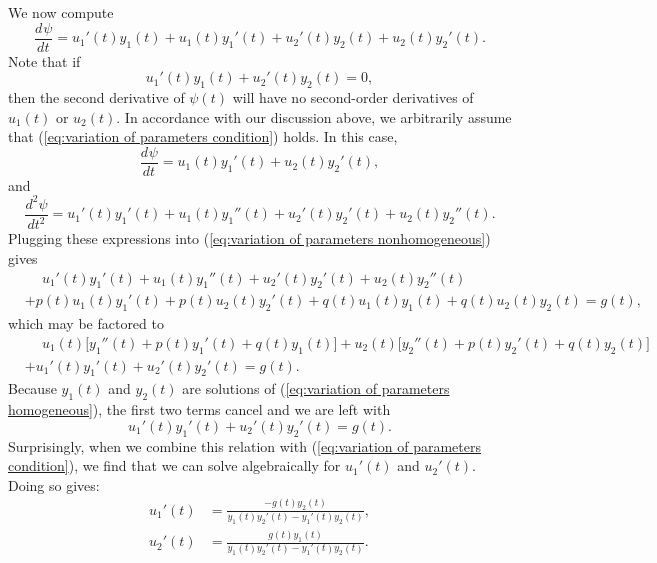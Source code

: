 \documentclass{myart}
\newcommand{\eq}[1]{(\ref{eq:#1})}
\newcommand{\deriv}[3][]{\frac{d^{#1}#2}{d#3^{#1}}}
\begin{document}
We now compute
\begin{equation*}
    \deriv{\psi}{t}
  = u_1'(t)y_1(t) + u_1(t)y_1'(t) + u_2'(t)y_2(t) + u_2(t)y_2'(t).
\end{equation*}
Note that if
\begin{equation} \label{eq:variation of parameters condition}
  u_1'(t)y_1(t) + u_2'(t)y_2(t) = 0,
\end{equation}
then the second derivative of $\psi(t)$ will have no second-order
derivatives of $u_1(t)$ or $u_2(t)$. In accordance with our discussion
above, we arbitrarily assume that \eq{variation of parameters
  condition} holds. In this case,
\begin{equation*}
  \deriv{\psi}{t} = u_1(t)y_1'(t) + u_2(t)y_2'(t),
\end{equation*}
and
\begin{equation*}
  \deriv[2]{\psi}{t} = u_1'(t)y_1'(t)
                     + u_1(t)y_1''(t)
                     + u_2'(t)y_2'(t)
                     + u_2(t)y_2''(t).
\end{equation*}
Plugging these expressions into \eq{variation of parameters
  nonhomogeneous} gives
\begin{align*}
  &\phantom{{}+{}} u_1'(t)y_1'(t)
              +    u_1(t)y_1''(t)
              +    u_2'(t)y_2'(t)
              +    u_2(t)y_2''(t) \\
  &+ p(t)u_1(t)y_1'(t)
   + p(t)u_2(t)y_2'(t)
   + q(t)u_1(t)y_1(t)
   + q(t)u_2(t)y_2(t)
   = g(t),
\end{align*}
which may be factored to
\begin{align*}
  &\phantom{{}+{}} u_1(t)\Big[y_1''(t)
              +    p(t)y_1'(t)
              +    q(t)y_1(t)\Big]
              +    u_2(t)\Big[y_2''(t)
              +    p(t)y_2'(t)
              +    q(t)y_2(t)\Big] \\
  &           +    u_1'(t)y_1'(t)
              +    u_2'(t)y_2'(t)
              =    g(t).
\end{align*}
Because $y_1(t)$ and $y_2(t)$ are solutions of \eq{variation of
  parameters homogeneous}, the first two terms cancel and we are left
with
\begin{equation*}
  u_1'(t)y_1'(t) + u_2'(t)y_2'(t) = g(t).
\end{equation*}
Surprisingly, when we combine this relation with \eq{variation of
  parameters condition}, we find that we can solve algebraically for
$u_1'(t)$ and $u_2'(t)$. Doing so gives:
\begin{align*}
  u_1'(t) &= \frac{-g(t)y_2(t)}{y_1(t)y_2'(t) - y_1'(t)y_2(t)}, \\
  u_2'(t) &= \frac{ g(t)y_1(t)}{y_1(t)y_2'(t) - y_1'(t)y_2(t)}.
\end{align*}
\end{document}
